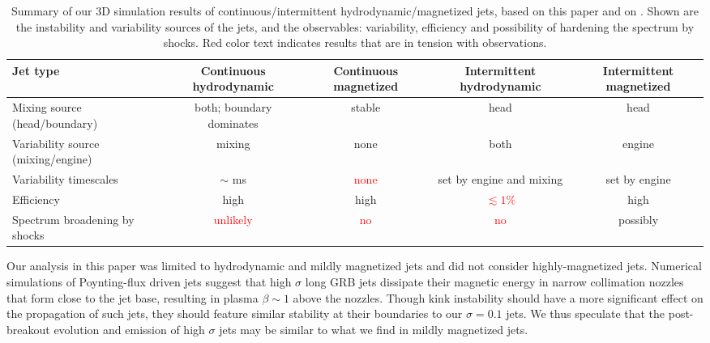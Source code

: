 \documentclass[fleqn,usenatbib]{mnras}
\begin{document}
	\begin{table*}
		\setlength{\tabcolsep}{6.8pt}
		\centering
		\begin{tabular}{ | l | c c c c | }
			
			\hline
			Jet type & Continuous hydrodynamic  & Continuous magnetized & Intermittent hydrodynamic & Intermittent magnetized \\ \hline
			Mixing source (head/boundary) & both; boundary dominates & stable & head & head \\
			Variability source (mixing/engine) & mixing & none & both & engine \\ \hline
			Variability timescales & $ \sim $ ms & \textcolor{red}{none} & set by engine and mixing & set by engine \\
			Efficiency & high & high & \textcolor{red}{$ \lesssim 1\% $} & high \\
			Spectrum broadening by shocks & \textcolor{red}{unlikely} & \textcolor{red}{no} & \textcolor{red}{no} & possibly \\

			\hline
			
		\end{tabular}
		\hfill\break
		
		\caption{
            Summary of our 3D simulation results of continuous/intermittent hydrodynamic/magnetized jets, based on this paper and on \citet{Gottlieb2019,Gottlieb2020b,Gottlieb2020a,Gottlieb2021}. Shown are the instability and variability sources of the jets, and the observables: variability, efficiency and possibility of hardening the spectrum by shocks. Red color text indicates results that are in tension with observations.
        		}
		\label{table:summary}
	\end{table*}
	
	Our analysis in this paper was limited to hydrodynamic and mildly magnetized jets and did not consider highly-magnetized jets. Numerical simulations of Poynting-flux driven jets \citep[e.g.][]{Bromberg2016,Bromberg2019} suggest that high $ \sigma $ long GRB jets dissipate their magnetic energy in narrow collimation nozzles that form close to the jet base, resulting in plasma $ \beta \sim 1 $ above the nozzles. Though kink instability should have a more significant effect on the propagation of such jets, they should feature similar stability at their boundaries to our $\sigma=0.1$ jets.
	We thus speculate that the post-breakout evolution and emission of high $ \sigma $ jets may be similar to what we find in mildly magnetized jets.
\end{document}
